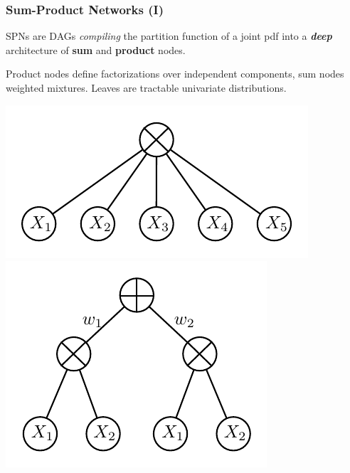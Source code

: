 \documentclass[xcolor={usenames,dvipsnames,svgnames}, compress]{beamer}
\begin{document}
\begin{frame}[t]
  \frametitle{Sum-Product Networks (I)}
  \footnotesize
   SPNs are DAGs \emph{compiling} the partition function of a joint pdf into a \textbf{\emph{deep}} architecture of \textbf{sum}
   and \textbf{product} nodes.\par\bigskip

   Product nodes define factorizations over independent components, sum
   nodes weighted mixtures. Leaves are tractable univariate distributions.\par\bigskip

   \begin{minipage}{0.45\linewidth}
    \centering
    \includegraphics[width=0.72\linewidth]{figures/spn-prod}\\
    \includegraphics[width=0.653\linewidth]{figures/spn-sum}
  \end{minipage}%
  \begin{minipage}{0.5\linewidth}
    \vspace{7pt}



\end{minipage}
\end{frame}
\end{document}

